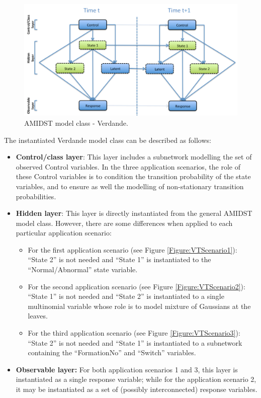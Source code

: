 \begin{figure}[ht!]
\begin{center}
\includegraphics[scale=0.39]{./figures/AMIDSTModelClassVerdande}
\caption{\label{Figure:AMIDSTModelClassVerdande} AMIDST model class - Verdande.}
\end{center}
\end{figure}

The instantiated Verdande model class can be described as follows:

\begin{itemize}
\item \textbf{Control/class layer}:  This layer includes a subnetwork modelling the set of observed Control variables. In the three application scenarios, the role of these Control variables is to condition the transition probability of the state variables, and to ensure as well the modelling of non-stationary transition probabilities.  

\item \textbf{Hidden layer}: This layer is directly instantiated from the general AMIDST model class. However, there are some differences when applied to each particular application scenario:

\begin{itemize}
\item For the first application scenario (see Figure \ref{Figure:VTScenario1}):  ``State 2'' is not needed and ``State 1'' is instantiated to the ``Normal/Abnormal'' state variable. 

\item For the second application scenario (see Figure \ref{Figure:VTScenario2}): ``State 1'' is not needed and ``State 2'' is instantiated to a single multinomial variable whose role is to model mixture of Gaussians at the leaves. 

\item For the third application scenario (see Figure \ref{Figure:VTScenario3}): ``State 2'' is not needed and ``State 1'' is instantiated to a subnetwork containing the ``FormationNo'' and ``Switch'' variables.
\end{itemize}

\item \textbf{Observable layer:} For both application scenarios 1 and 3, this layer is instantiated as a single response variable; while for the application scenario 2, it may be instantiated as a set of (possibly interconnected) response variables. 
\end{itemize}

